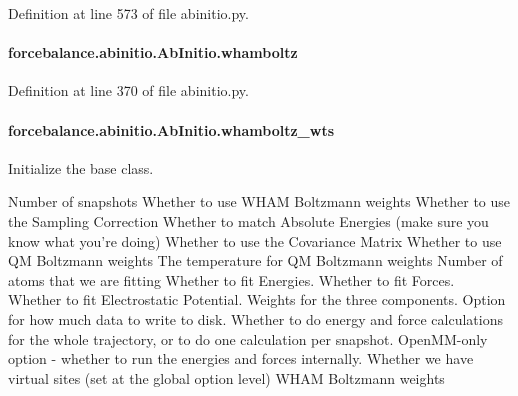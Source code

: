Definition at line 573 of file abinitio.\-py.

\hypertarget{classforcebalance_1_1abinitio_1_1AbInitio_a8f70f017ca8ec54c1acdbc85eff06ab9}{
\paragraph[{whamboltz}]{\setlength{\rightskip}{0pt plus 5cm}forcebalance.\-abinitio.\-Ab\-Initio.\-whamboltz\hspace{0.3cm}{\ttfamily [inherited]}}}\label{classforcebalance_1_1abinitio_1_1AbInitio_a8f70f017ca8ec54c1acdbc85eff06ab9}


Definition at line 370 of file abinitio.\-py.

\hypertarget{classforcebalance_1_1abinitio_1_1AbInitio_a885e7ef58b9e7c6abbc24321e5f3c61a}{
\paragraph[{whamboltz\-\_\-wts}]{\setlength{\rightskip}{0pt plus 5cm}forcebalance.\-abinitio.\-Ab\-Initio.\-whamboltz\-\_\-wts\hspace{0.3cm}{\ttfamily [inherited]}}}\label{classforcebalance_1_1abinitio_1_1AbInitio_a885e7ef58b9e7c6abbc24321e5f3c61a}


Initialize the base class. 

Number of snapshots Whether to use W\-H\-A\-M Boltzmann weights Whether to use the Sampling Correction Whether to match Absolute Energies (make sure you know what you're doing) Whether to use the Covariance Matrix Whether to use Q\-M Boltzmann weights The temperature for Q\-M Boltzmann weights Number of atoms that we are fitting Whether to fit Energies. Whether to fit Forces. Whether to fit Electrostatic Potential. Weights for the three components. Option for how much data to write to disk. Whether to do energy and force calculations for the whole trajectory, or to do one calculation per snapshot. Open\-M\-M-\/only option -\/ whether to run the energies and forces internally. Whether we have virtual sites (set at the global option level) W\-H\-A\-M Boltzmann weights 

